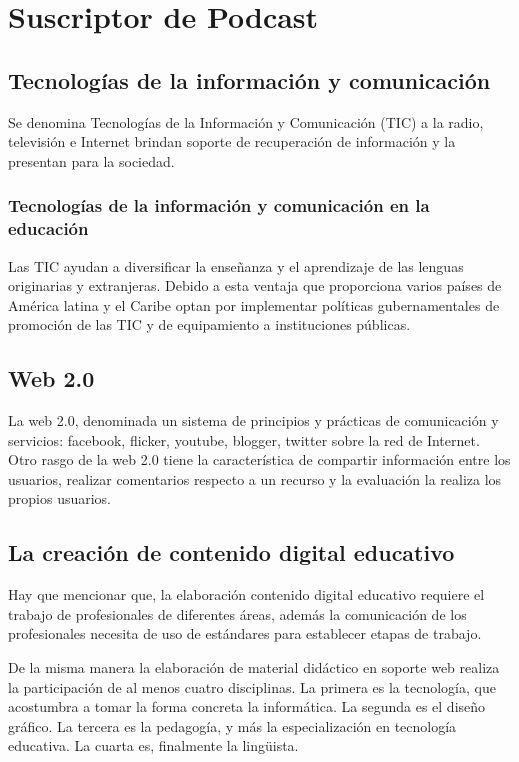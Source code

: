 \chapter{Suscriptor de Podcast}

\section{Tecnologías de la información y comunicación}

Se denomina Tecnologías de la Información y Comunicación (TIC) a la radio,
televisión e Internet brindan soporte de recuperación de información
y la presentan para la sociedad.

\subsection{Tecnologías de la información y comunicación en la educación}

Las TIC ayudan a diversificar la enseñanza y el aprendizaje de las lenguas
originarias y extranjeras. Debido a esta ventaja que proporciona varios
países de América latina y el Caribe optan por implementar políticas
gubernamentales de promoción de las TIC y de equipamiento a instituciones
públicas.

\section{Web 2.0}

La web 2.0, denominada un sistema de principios y prácticas de comunicación y
servicios: facebook, flicker, youtube, blogger, twitter sobre la red de Internet.
Otro rasgo de la web 2.0 tiene la característica de compartir información entre
los usuarios, realizar comentarios respecto a un recurso y la evaluación la
realiza los propios usuarios. 

\section{La creación de contenido digital educativo}

Hay que mencionar que, la elaboración contenido digital educativo requiere el
trabajo de profesionales de diferentes áreas, además la comunicación de los
profesionales necesita de uso de estándares para establecer etapas de trabajo.

De la misma manera la elaboración de material didáctico en soporte web
realiza la participación de al menos cuatro disciplinas. La primera es la
tecnología, que acostumbra a tomar la forma concreta la informática. La
segunda es el diseño gráfico. La tercera es la pedagogía, y más la
especialización en tecnología educativa. La cuarta es, finalmente la lingüista.
\cite{duart2000aprender}

